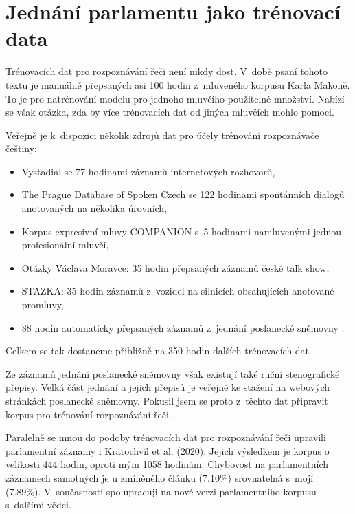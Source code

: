 \chapter{Jednání parlamentu jako trénovací data}
\label{kap:svolocz}

Trénovacích dat pro rozpoznávání řeči není nikdy dost. V~době psaní tohoto textu
je manuálně přepsaných asi 100 hodin z~mluveného korpusu Karla Makoně. To je pro
natrénování modelu pro jednoho mluvčího použitelné množství. Nabízí se však otázka,
zda by více trénovacích dat od jiných mluvčích mohlo pomoci.

Veřejně je k~dispozici několik zdrojů dat pro účely trénování
rozpoznávače češtiny:
\begin{itemize}
\item{
    Vystadial\cite{vystadialarticle} se 77 hodinami záznamů internetových
    rozhovorů\cite{vystadialdata},
}
\item{
    The Prague Database of Spoken Czech\cite{pdtscarticle} se 122 hodinami
    spontánních dialogů anotovaných na několika úrovních\cite{pdtscdata},
}
\item{
    Korpus expresivní mluvy COMPANION s~5 hodinami namluvenými jednou
    profesionální mluvčí\cite{companiondata},
}
\item{
    Otázky Václava Moravce: 35 hodin přepsaných záznamů české talk
    show\cite{ovmdata},
}
\item{
    STAZKA: 35 hodin záznamů z~vozidel na silnicích obsahujících anotované
    promluvy\cite{stazkadata},
}
\item{
    88 hodin automaticky přepsaných záznamů z~jednání poslanecké
    sněmovny \cite{pspdata}.
}
\end{itemize}
Celkem se tak dostaneme přibližně na 350 hodin dalších trénovacích dat.

Ze záznamů jednání poslanecké sněmovny však existují také ruční stenografické
přepisy. Velká část jednání a jejich přepisů je veřejně ke stažení na webových
stránkách poslanecké sněmovny. Pokusil jsem se proto z~těchto dat připravit
korpus pro trénování rozpoznávání řeči.

Paralelně se mnou do podoby trénovacích
dat pro rozpoznávání řeči upravili parlamentní záznamy i Kratochvíl et al.
(2020)\cite{kratochvil2020large}. Jejich výsledkem je korpus o velikosti 444
hodin, oproti mým 1058 hodinám. Chybovost na parlamentních záznamech samotných
je u zmíněného článku (7.10\%) srovnatelná s~mojí (7.89\%).
V~současnosti spolupracuji na nové verzi parlamentního korpusu s~dalšími vědci.

